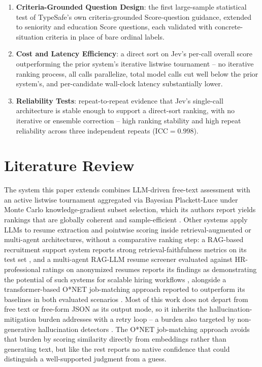 \documentclass[journal]{IEEEtran}
\begin{document}
\begin{enumerate}
\item \textbf{Criteria-Grounded Question Design}: the first large-sample statistical test of TypeSafe's own criteria-grounded Score-question guidance, extended to seniority and education Score questions, each validated with concrete-situation criteria in place of bare ordinal labels.
\item \textbf{Cost and Latency Efficiency}: a direct sort on Jev's per-call overall score outperforming the prior system's iterative listwise tournament -- no iterative ranking process, all calls parallelize, total model calls cut well below the prior system's, and per-candidate wall-clock latency substantially lower.
\item \textbf{Reliability Tests}: repeat-to-repeat evidence that Jev's single-call architecture is stable enough to support a direct-sort ranking, with no iterative or ensemble correction -- high ranking stability and high repeat reliability across three independent repeats (ICC$=0.998$).
\end{enumerate}

\section{Literature Review}

The system this paper extends combines LLM-driven free-text assessment with an active listwise tournament aggregated via Bayesian Plackett-Luce under Monte Carlo knowledge-gradient subset selection, which its authors report yields rankings that are globally coherent and sample-efficient \cite{ref1,ref2}. Other systems apply LLMs to resume extraction and pointwise scoring inside retrieval-augmented or multi-agent architectures, without a comparative ranking step: a RAG-based recruitment support system reports strong retrieval-faithfulness metrics on its test set \cite{ref3}, and a multi-agent RAG-LLM resume screener evaluated against HR-professional ratings on anonymized resumes reports its findings as demonstrating the potential of such systems for scalable hiring workflows \cite{ref4}, alongside a transformer-based O*NET job-matching approach reported to outperform its baselines in both evaluated scenarios \cite{ref14}. Most of this work does not depart from free text or free-form JSON as its output mode, so it inherits the hallucination-mitigation burden \cite{ref2} addresses with a retry loop -- a burden also targeted by non-generative hallucination detectors \cite{ref15}. The O*NET job-matching approach \cite{ref14} avoids that burden by scoring similarity directly from embeddings rather than generating text, but like the rest reports no native confidence that could distinguish a well-supported judgment from a guess.
\end{document}
